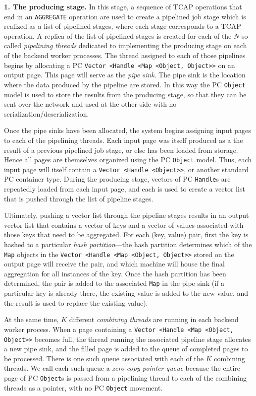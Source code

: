 \vspace{5pt}
{\bf 1. The producing stage.} In this stage, a sequence of TCAP operations that end in an \texttt{AGGREGATE} operation are used to create a pipelined job stage which is 
realized as a list
of pipelined stages, where each stage corresponds to a TCAP operation.
A replica of the list of pipelined stages is
created for each of the $N$ so-called \emph{pipelining threads} dedicated to implementing
the producing stage on each of the backend worker processes.  
The thread assigned to each of those pipelines begins by allocating a PC \texttt{Vector <Handle <Map <Object, Object>>} on an output page.  This page will serve
as the \emph{pipe sink}.  The pipe sink is
the location where the data produced by the pipeline are stored.  In this way the PC \texttt{Object} model is used to store the results
from the producing stage, so that they can be sent over the network and used at the other side with no serialization/deserialization.

Once the pipe sinks have been allocated,
the system begins assigning input pages to each of the pipelining 
threads.  Each input page was itself produced as a the result of a previous pipelined job stage, or else has been
loaded from storage.  Hence all pages are themselves organized using the PC \texttt{Object} model.  Thus, each input
page will itself contain a \texttt{Vector <Handle <Object>>},
or another standard PC container type.  During the producing stage, vectors of PC \texttt{Handle}s are repeatedly
loaded from each input page, and each is used to create a vector list that is pushed through the list of pipeline stages.

Ultimately, pushing a vector list through the pipeline stages results in an output vector list that contains a vector of keys and a vector of values 
associated with those keys that need to be aggregated.  
For each (key, value)
pair, first the key is hashed to a particular \emph{hash partition}---the hash partition determines which of the \texttt{Map}
objects in the \texttt{Vector <Handle <Map <Object, Object>>} stored on the output page will receive the pair, and which machine will house the final aggregation
for all instances of the key.  Once the hash partition has been determined,
the pair is added to the associated \texttt{Map} in the pipe sink
(if a particular key is already there, the
existing value is added to the new value, and the result is used to replace the existing value).  

At the same time, 
$K$ different \emph{combining threads} are running in each backend worker process.  
When a page containing a \texttt{Vector <Handle <Map <Object, Object>>} becomes full, the thread running the associated pipeline stage allocates a new
pipe sink,
and the filled page is added to the queue of completed pages to be processed.  There is one such queue
associated with each of the $K$ combining threads.
We call each such queue a \emph{zero copy pointer queue} because the entire page of PC \texttt{Object}s is passed from a pipelining thread to each of the
combining threads as a pointer, with no PC \texttt{Object} movement.

